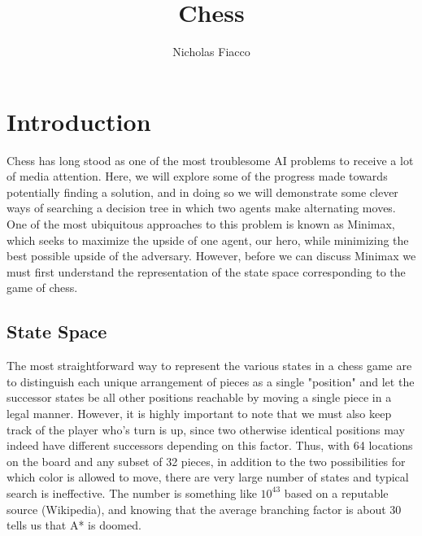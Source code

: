 \documentclass[11pt, oneside]{article}%
\title{Chess}
\author{Nicholas Fiacco}
\begin{document}
\maketitle

\section{Introduction}
Chess has long stood as one of the most troublesome AI problems to receive a lot of media attention.  Here, we will explore some of the progress made towards potentially finding a solution, and in doing so we will demonstrate some clever ways of searching a decision tree in which two agents make alternating moves.  One of the most ubiquitous approaches to this problem is known as Minimax, which seeks to maximize the upside of one agent, our hero, while minimizing the best possible upside of the adversary.  However, before we can discuss Minimax we must first understand the representation of the state space corresponding to the game of chess.
\subsection{State Space}
The most straightforward way to represent the various states in a chess game are to distinguish each unique arrangement of pieces as a single "position" and let the successor states be all other positions reachable by moving a single piece in a legal manner.  However, it is highly important to note that we must also keep track of the player who's turn is up, since two otherwise identical positions may indeed have different successors depending on this factor.  Thus, with 64 locations on the board and any subset of 32 pieces, in addition to the two possibilities for which color is allowed to move, there are very large number of states and typical search is ineffective.  The number is something like $10^{43}$ based on a reputable source (Wikipedia), and knowing that the average branching factor is about 30 tells us that A* is doomed.
\end{document}
